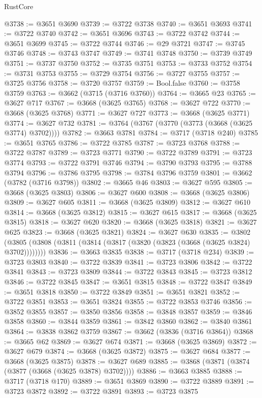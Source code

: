 \begin{lexlean}{RustCore}
\begin{coremodule}
@3738 := @3651 @3690
@3739 := @3722 @3738
@3740 := @3651 @3693
@3741 := @3722 @3740
@3742 := @3651 @3696
@3743 := @3722 @3742
@3744 := @3651 @3699
@3745 := @3722 @3744
@3746 := @29 @3721
@3747 := @3745 @3746
@3748 := @3743 @3747
@3749 := @3741 @3748
@3750 := @3739 @3749
@3751 := @3737 @3750
@3752 := @3735 @3751
@3753 := @3733 @3752
@3754 := @3731 @3753
@3755 := @3729 @3754
@3756 := @3727 @3755
@3757 := @3725 @3756
@3758 := @3720 @3757
@3759 := Bool.false
@3760 := @3758 @3759
@3763 := @3662 (@3715 (@3716 @3760))
@3764 := @3665 @23
@3765 := @3627 @717
@3767 := @3668 (@3625 @3765)
@3768 := @3627 @722
@3770 := @3668 (@3625 @3768)
@3771 := @3627 @727
@3773 := @3668 (@3625 @3771)
@3774 := @3627 @732
@3781 := @3764 (@3767 (@3770 (@3773 (@3668 (@3625 @3774) @3702))))
@3782 := @3663 @3781
@3784 := @3717 (@3718 @240)
@3785 := @3651 @3765
@3786 := @3722 @3785
@3787 := @3723 @3768
@3788 := @3722 @3787
@3789 := @3723 @3771
@3790 := @3722 @3789
@3791 := @3723 @3774
@3793 := @3722 @3791 @3746
@3794 := @3790 @3793
@3795 := @3788 @3794
@3796 := @3786 @3795
@3798 := @3784 @3796 @3759
@3801 := @3662 (@3782 (@3716 @3798))
@3802 := @3665 @46
@3803 := @3627 @595
@3805 := @3668 (@3625 @3803)
@3806 := @3627 @600
@3808 := @3668 (@3625 @3806)
@3809 := @3627 @605
@3811 := @3668 (@3625 @3809)
@3812 := @3627 @610
@3814 := @3668 (@3625 @3812)
@3815 := @3627 @615
@3817 := @3668 (@3625 @3815)
@3818 := @3627 @620
@3820 := @3668 (@3625 @3818)
@3821 := @3627 @625
@3823 := @3668 (@3625 @3821)
@3824 := @3627 @630
@3835 := @3802 (@3805 (@3808 (@3811 (@3814 (@3817 (@3820 (@3823 (@3668 (@3625 @3824) @3702))))))))
@3836 := @3663 @3835
@3838 := @3717 (@3718 @234)
@3839 := @3723 @3803
@3840 := @3722 @3839
@3841 := @3723 @3806
@3842 := @3722 @3841
@3843 := @3723 @3809
@3844 := @3722 @3843
@3845 := @3723 @3812
@3846 := @3722 @3845
@3847 := @3651 @3815
@3848 := @3722 @3847
@3849 := @3651 @3818
@3850 := @3722 @3849
@3851 := @3651 @3821
@3852 := @3722 @3851
@3853 := @3651 @3824
@3855 := @3722 @3853 @3746
@3856 := @3852 @3855
@3857 := @3850 @3856
@3858 := @3848 @3857
@3859 := @3846 @3858
@3860 := @3844 @3859
@3861 := @3842 @3860
@3862 := @3840 @3861
@3864 := @3838 @3862 @3759
@3867 := @3662 (@3836 (@3716 @3864))
@3868 := @3665 @62
@3869 := @3627 @674
@3871 := @3668 (@3625 @3869)
@3872 := @3627 @679
@3874 := @3668 (@3625 @3872)
@3875 := @3627 @684
@3877 := @3668 (@3625 @3875)
@3878 := @3627 @689
@3885 := @3868 (@3871 (@3874 (@3877 (@3668 (@3625 @3878) @3702))))
@3886 := @3663 @3885
@3888 := @3717 (@3718 @170)
@3889 := @3651 @3869
@3890 := @3722 @3889
@3891 := @3723 @3872
@3892 := @3722 @3891
@3893 := @3723 @3875

\end{coremodule}
\end{lexlean}
